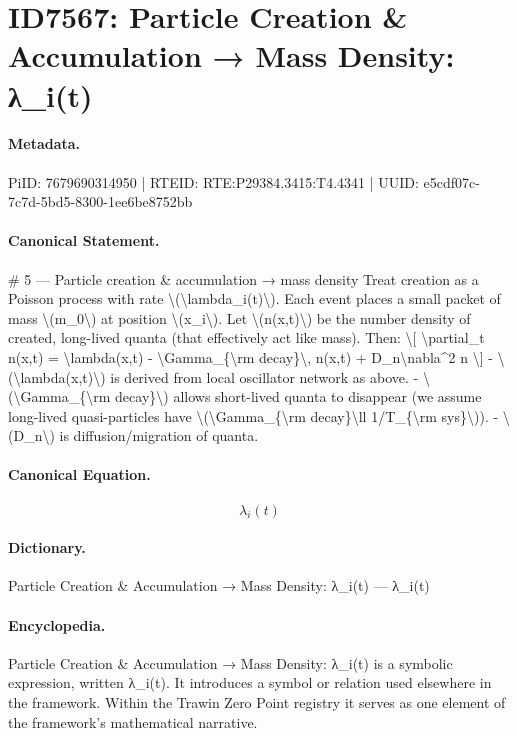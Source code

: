 \section*{ID7567: Particle Creation \& Accumulation → Mass Density: λ\_i(t)}
\paragraph{Metadata.}
PiID: 7679690314950 | RTEID: RTE:P29384.3415:T4.4341 | UUID: e5cdf07c-7c7d-5bd5-8300-1ee6be8752bb

\paragraph{Canonical Statement.}
\# 5 — Particle creation \& accumulation → mass density Treat creation as a Poisson process with rate \textbackslash{}(\textbackslash{}lambda\_i(t)\textbackslash{}). Each event places a small packet of mass \textbackslash{}(m\_0\textbackslash{}) at position \textbackslash{}(x\_i\textbackslash{}). Let \textbackslash{}(n(x,t)\textbackslash{}) be the number density of created, long-lived quanta (that effectively act like mass). Then: \textbackslash{}[ \textbackslash{}partial\_t n(x,t) = \textbackslash{}lambda(x,t) - \textbackslash{}Gamma\_\{\textbackslash{}rm decay\}\textbackslash{}, n(x,t) + D\_n\textbackslash{}nabla\textasciicircum{}2 n \textbackslash{}] - \textbackslash{}(\textbackslash{}lambda(x,t)\textbackslash{}) is derived from local oscillator network as above. - \textbackslash{}(\textbackslash{}Gamma\_\{\textbackslash{}rm decay\}\textbackslash{}) allows short-lived quanta to disappear (we assume long-lived quasi-particles have \textbackslash{}(\textbackslash{}Gamma\_\{\textbackslash{}rm decay\}\textbackslash{}ll 1/T\_\{\textbackslash{}rm sys\}\textbackslash{})). - \textbackslash{}(D\_n\textbackslash{}) is diffusion/migration of quanta.

\paragraph{Canonical Equation.}
\[
\lambda_i(t)
\]

\paragraph{Dictionary.}
Particle Creation \& Accumulation → Mass Density: λ\_i(t) — λ\_i(t)

\paragraph{Encyclopedia.}
Particle Creation \& Accumulation → Mass Density: λ\_i(t) is a symbolic expression, written λ\_i(t). It introduces a symbol or relation used elsewhere in the framework. Within the Trawin Zero Point registry it serves as one element of the framework's mathematical narrative.
